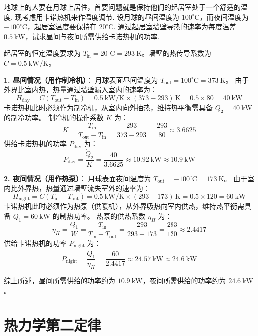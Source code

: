 \begin{exercise}\label{ex:11.15}
地球上的人要在月球上居住，首要问题就是保持他们的起居室处于一个舒适的温度. 现考虑用卡诺热机来作温度调节. 设月球的昼间温度为 $100^\circ\mathrm{C}$，而夜间温度为 $-100^\circ\mathrm{C}$，起居室温度要保持在 $20^\circ\mathrm{C}$. 通过起居室墙壁导热的速率为每度温差 $0.5 \ \mathrm{kW}$，试求昼间与夜间所需供给卡诺热机的功率.
\end{exercise}
\begin{solution}
起居室的恒定温度要求为 $T_{\text{in}} = 20^\circ\mathrm{C} = 293 \ \mathrm{K}$。墙壁的热传导系数为 $C = 0.5 \ \mathrm{kW/K}$。

\textbf{1. 昼间情况（用作制冷机）}：
月球表面昼间温度为 $T_{\text{out}} = 100^\circ\mathrm{C} = 373 \ \mathrm{K}$。
由于外界比室内热，热量通过墙壁漏入室内的速率为：
$$ H_{\text{day}} = C (T_{\text{out}} - T_{\text{in}}) = 0.5 \ \mathrm{kW/K} \times (373 - 293) \ \mathrm{K} = 0.5 \times 80 = 40 \ \mathrm{kW} $$
卡诺热机此时必须作为制冷机，从室内向外抽热，维持热平衡需具备 $\dot{Q}_2 = 40 \ \mathrm{kW}$ 的制冷功率。
制冷机的操作系数 $K$ 为：
$$ K = \frac{T_{\text{in}}}{T_{\text{out}} - T_{\text{in}}} = \frac{293}{373 - 293} = \frac{293}{80} \approx 3.6625 $$
供给卡诺热机的功率 $P_{\text{day}}$ 为：
$$ P_{\text{day}} = \frac{\dot{Q}_2}{K} = \frac{40}{3.6625} \approx 10.92 \ \mathrm{kW} \approx 10.9 \ \mathrm{kW} $$

\textbf{2. 夜间情况（用作热泵）}：
月球表面夜间温度为 $T_{\text{out}} = -100^\circ\mathrm{C} = 173 \ \mathrm{K}$。
由于室内比外界热，热量通过墙壁流失室外的速率为：
$$ H_{\text{night}} = C (T_{\text{in}} - T_{\text{out}}) = 0.5 \ \mathrm{kW/K} \times (293 - 173) \ \mathrm{K} = 0.5 \times 120 = 60 \ \mathrm{kW} $$
卡诺热机此时必须作为热泵（供暖机），从外界吸热向室内供热，维持热平衡需具备 $\dot{Q}_1 = 60 \ \mathrm{kW}$ 的制热功率。
热泵的供热系数 $\eta_H$ 为：
$$ \eta_H = \frac{Q_1}{W} = \frac{T_{\text{in}}}{T_{\text{in}} - T_{\text{out}}} = \frac{293}{293 - 173} = \frac{293}{120} \approx 2.4417 $$
供给卡诺热机的功率 $P_{\text{night}}$ 为：
$$ P_{\text{night}} = \frac{\dot{Q}_1}{\eta_H} = \frac{60}{2.4417} \approx 24.57 \ \mathrm{kW} \approx 24.6 \ \mathrm{kW} $$

综上所述，昼间所需供给的功率约为 $10.9 \ \mathrm{kW}$，夜间所需供给的功率约为 $24.6 \ \mathrm{kW}$。
\end{solution}



\chapter{热力学第二定律}

